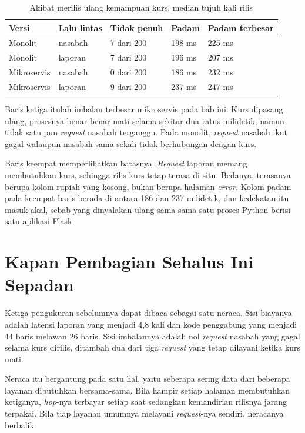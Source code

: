 \begin{table}[htbp]
  \centering
  \caption{Akibat merilis ulang kemampuan kurs, median tujuh kali rilis}
  \label{tab:rilis}
  \begin{tabularx}{\textwidth}{|l|X|l|l|l|}
    \hline
    \textbf{Versi} & \textbf{Lalu lintas} & \textbf{Tidak penuh} & \textbf{Padam} & \textbf{Padam terbesar} \\
    \hline
    Monolit & nasabah & 7 dari 200 & 198 ms & 225 ms \\
    \hline
    Monolit & laporan & 7 dari 200 & 196 ms & 207 ms \\
    \hline
    Mikroservis & nasabah & 0 dari 200 & 186 ms & 232 ms \\
    \hline
    Mikroservis & laporan & 9 dari 200 & 237 ms & 247 ms \\
    \hline
  \end{tabularx}
\end{table}

Baris ketiga itulah imbalan terbesar mikroservis pada bab ini. Kurs dipasang
ulang, prosesnya benar-benar mati selama sekitar dua ratus milidetik, namun tidak
satu pun \textit{request} nasabah terganggu. Pada monolit, \textit{request} nasabah ikut
gagal walaupun nasabah sama sekali tidak berhubungan dengan kurs.

Baris keempat memperlihatkan batasnya. \textit{Request} laporan memang membutuhkan
kurs, sehingga rilis kurs tetap terasa di situ. Bedanya, terasanya berupa kolom
rupiah yang kosong, bukan berupa halaman \textit{error}. Kolom padam pada keempat
baris berada di antara 186 dan 237 milidetik, dan kedekatan itu masuk akal,
sebab yang dinyalakan ulang sama-sama satu proses Python berisi satu aplikasi
Flask.

\section{Kapan Pembagian Sehalus Ini Sepadan}

Ketiga pengukuran sebelumnya dapat dibaca sebagai satu neraca. Sisi biayanya
adalah latensi laporan yang menjadi 4,8 kali dan kode penggabung yang
menjadi 44 baris melawan 26 baris. Sisi imbalannya adalah nol \textit{request}
nasabah yang gagal selama kurs dirilis, ditambah dua dari tiga \textit{request} yang
tetap dilayani ketika kurs mati.

Neraca itu bergantung pada satu hal, yaitu seberapa sering data dari beberapa
layanan dibutuhkan bersama-sama. Bila hampir setiap halaman membutuhkan
ketiganya, \textit{hop}-nya terbayar setiap saat sedangkan kemandirian rilisnya
jarang terpakai. Bila tiap layanan umumnya melayani \textit{request}-nya sendiri,
neracanya berbalik.


